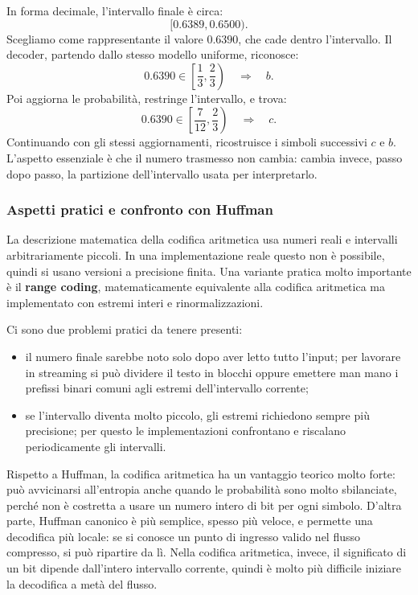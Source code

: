 \documentclass{article}
\theoremstyle{definition}
\numberwithin{equation}{section}
\begin{document}
In forma decimale, l'intervallo finale è circa:
\[
    [0.6389,0.6500).
\]
Scegliamo come rappresentante il valore $0.6390$, che cade dentro l'intervallo. Il decoder, partendo dallo stesso modello uniforme, riconosce:
\[
    0.6390\in\left[\frac{1}{3},\frac{2}{3}\right)
    \quad \Rightarrow \quad b.
\]
Poi aggiorna le probabilità, restringe l'intervallo, e trova:
\[
    0.6390\in\left[\frac{7}{12},\frac{2}{3}\right)
    \quad \Rightarrow \quad c.
\]
Continuando con gli stessi aggiornamenti, ricostruisce i simboli successivi $c$ e $b$. L'aspetto essenziale è che il numero trasmesso non cambia: cambia invece, passo dopo passo, la partizione dell'intervallo usata per interpretarlo.

\subsubsection{Aspetti pratici e confronto con Huffman}
La descrizione matematica della codifica aritmetica usa numeri reali e intervalli arbitrariamente piccoli. In una implementazione reale questo non è possibile, quindi si usano versioni a precisione finita. Una variante pratica molto importante è il \textbf{range coding}, matematicamente equivalente alla codifica aritmetica ma implementato con estremi interi e rinormalizzazioni.

Ci sono due problemi pratici da tenere presenti:
\begin{itemize}
    \item il numero finale sarebbe noto solo dopo aver letto tutto l'input; per lavorare in streaming si può dividere il testo in blocchi oppure emettere man mano i prefissi binari comuni agli estremi dell'intervallo corrente;
    \item se l'intervallo diventa molto piccolo, gli estremi richiedono sempre più precisione; per questo le implementazioni confrontano e riscalano periodicamente gli intervalli.
\end{itemize}

Rispetto a Huffman, la codifica aritmetica ha un vantaggio teorico molto forte: può avvicinarsi all'entropia anche quando le probabilità sono molto sbilanciate, perché non è costretta a usare un numero intero di bit per ogni simbolo. D'altra parte, Huffman canonico è più semplice, spesso più veloce, e permette una decodifica più locale: se si conosce un punto di ingresso valido nel flusso compresso, si può ripartire da lì. Nella codifica aritmetica, invece, il significato di un bit dipende dall'intero intervallo corrente, quindi è molto più difficile iniziare la decodifica a metà del flusso.
\end{document}

